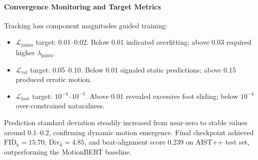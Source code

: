 \paragraph{Convergence Monitoring and Target Metrics}
Tracking loss component magnitudes guided training:
\begin{itemize}
    \item $\mathcal{L}_{\text{joints}}$ target: 0.01–0.02. Below 0.01 indicated overfitting; above 0.03 required higher $\lambda_{\text{joints}}$.
    \item $\mathcal{L}_{\text{vel}}$ target: 0.05–0.10. Below 0.01 signaled static predictions; above 0.15 produced erratic motion.
    \item $\mathcal{L}_{\text{foot}}$ target: $10^{-4}$–$10^{-3}$. Above 0.01 revealed excessive foot sliding; below $10^{-4}$ over-constrained naturalness.
\end{itemize}
Prediction standard deviation steadily increased from near-zero to stable values around 0.1–0.2, confirming dynamic motion emergence. Final checkpoint achieved $\text{FID}_k=15.70$, $\text{Div}_k=4.85$, and beat-alignment score 0.239 on AIST++ test set, outperforming the MotionBERT baseline.

